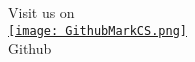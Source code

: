 \begin{frame}[plain]
 \titlepage
\small{ Visit us on } \\ \vspace{2pt}
\hspace{0.17cm} {\href{https://github.com/HumancapitalAnalysis}{\texttt{[image: GithubMarkCS.png]}}}\\
\vspace{-5pt} \hspace{0.21cm} \small{Github}
\end{frame}
